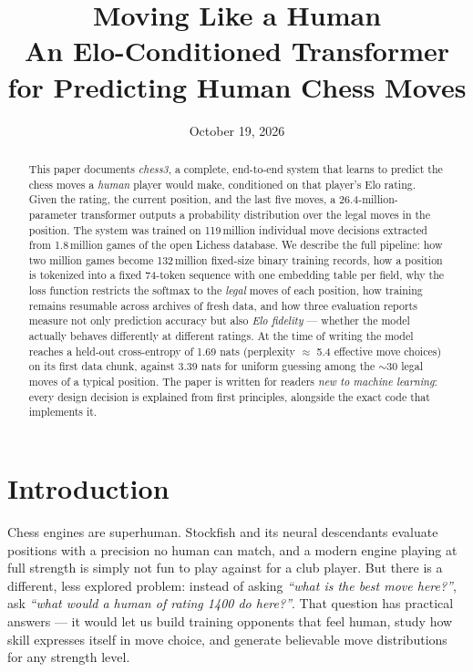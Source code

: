 \documentclass[10pt,a4paper]{article}
\title{\textbf{Moving Like a Human}\\[2mm]
\large An Elo-Conditioned Transformer for Predicting Human Chess Moves}
\author{} %
\date{October 19, 2026}
\begin{document}
\maketitle

\begin{abstract}
\noindent
This paper documents \emph{chess3}, a complete, end-to-end system that learns
to predict the chess moves a \emph{human} player would make, conditioned on
that player's Elo rating. Given the rating, the current position, and the
last five moves, a 26.4-million-parameter transformer outputs a probability
distribution over the legal moves in the position. The system was trained on
119\,million individual move decisions extracted from 1.8\,million games of
the open Lichess database. We describe the full pipeline: how two million
games become 132\,million fixed-size binary training records, how a position
is tokenized into a fixed 74-token sequence with one embedding table per
field, why the loss function restricts the softmax to the \emph{legal} moves
of each position, how training remains resumable across archives of fresh
data, and how three evaluation reports measure not only prediction accuracy
but also \emph{Elo fidelity} --- whether the model actually behaves
differently at different ratings. At the time of writing the model reaches a
held-out cross-entropy of 1.69 nats (perplexity $\approx$ 5.4 effective move
choices) on its first data chunk, against 3.39 nats for uniform guessing
among the $\sim$30 legal moves of a typical position. The paper is written
for readers \emph{new to machine learning}: every design decision is
explained from first principles, alongside the exact code that implements it.
\end{abstract}

\setcounter{tocdepth}{1}
\tableofcontents

\section{Introduction}\label{sec:intro}

Chess engines are superhuman. Stockfish and its neural descendants evaluate
positions with a precision no human can match, and a modern engine playing
at full strength is simply not fun to play against for a club player. But
there is a different, less explored problem: instead of asking
\emph{``what is the best move here?''}, ask \emph{``what would a human of
rating 1400 do here?''}. That question has practical answers --- it would
let us build training opponents that feel human, study how skill expresses
itself in move choice, and generate believable move distributions for any
strength level.
\end{document}
